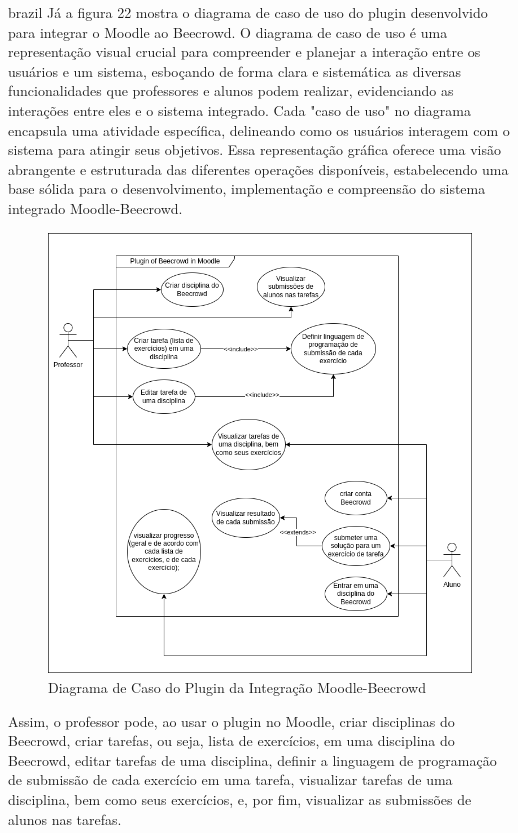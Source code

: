 \begin{otherlanguage*}{brazil}
    Já a figura 22 mostra o diagrama de caso de uso do plugin desenvolvido para integrar o Moodle ao Beecrowd. O diagrama de caso de uso é uma representação visual crucial para compreender e planejar a interação entre os usuários e um sistema, esboçando de forma clara e sistemática as diversas funcionalidades que professores e alunos podem realizar, evidenciando as interações entre eles e o sistema integrado. Cada "caso de uso" no diagrama encapsula uma atividade específica, delineando como os usuários interagem com o sistema para atingir seus objetivos. Essa representação gráfica oferece uma visão abrangente e estruturada das diferentes operações disponíveis, estabelecendo uma base sólida para o desenvolvimento, implementação e compreensão do sistema integrado Moodle-Beecrowd.

    \begin{figure}[h!]
        \centering
             \caption{Diagrama de Caso do Plugin da Integração Moodle-Beecrowd}
             \label{fig:ModeloConceitual}
            \includegraphics[scale=0.6]{pictures/caso_de_uso.png}
    \end{figure}

    Assim, o professor pode, ao usar o plugin no Moodle, criar disciplinas do Beecrowd, criar tarefas, ou seja, lista de exercícios, em uma disciplina do Beecrowd, editar tarefas de uma disciplina, definir a linguagem de programação de submissão de cada exercício em uma tarefa, visualizar tarefas de uma disciplina, bem como seus exercícios, e, por fim, visualizar as submissões de alunos nas tarefas. 
    

\end{otherlanguage*}

